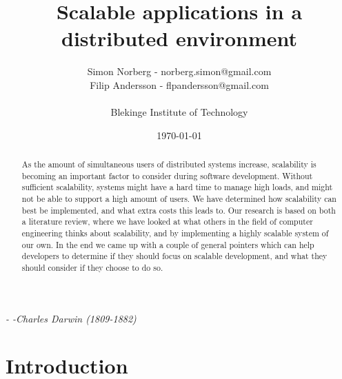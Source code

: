 \documentclass{article}
\begin{document}

\title{Scalable applications in a distributed environment}
\author{Simon Norberg - norberg.simon@gmail.com\\
        Filip Andersson - flpandersson@gmail.com \\
	\\
	Blekinge Institute of Technology}
\date{\today}

\maketitle

\thispagestyle{empty}

\newpage
{}
\begin{flushright}
\emph{- -Charles Darwin (1809-1882)}
\end{flushright}
\thispagestyle{empty}

\newpage
\setcounter{page}{1} 
\begin{abstract}
As the amount of simultaneous users of distributed systems increase,
scalability is becoming an important factor to consider during software
development. Without sufficient scalability, systems might have a hard time to
manage high loads, and might not be able to support a high amount of users. We
have determined how scalability can best be implemented, and what extra costs
this leads to. Our research is based on both a literature review, where we have
looked at what others in the field of computer engineering thinks about
scalability, and by implementing a highly scalable system of our own.  In the
end we came up with a couple of general pointers which can help developers to
determine if they should focus on scalable development, and what they should
consider if they choose to do so.
\end{abstract}
\section{Introduction}
\end{document}
